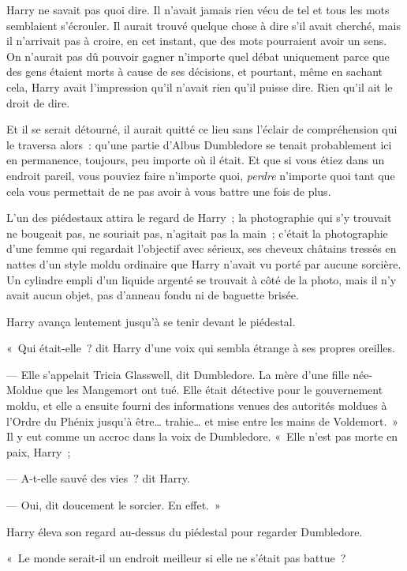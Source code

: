 Harry ne savait pas quoi dire. Il n'avait jamais rien vécu de tel et tous les mots semblaient s'écrouler. Il aurait trouvé quelque chose à dire s'il avait cherché, mais il n'arrivait pas à croire, en cet instant, que des mots pourraient avoir un sens. On n'aurait pas dû pouvoir gagner n'importe quel débat uniquement parce que des gens étaient morts à cause de ses décisions, et pourtant, même en sachant cela, Harry avait l'impression qu'il n'avait rien qu'il puisse dire. Rien qu'il ait le droit de dire.

Et il se serait détourné, il aurait quitté ce lieu sans l'éclair de compréhension qui le traversa alors~: qu'une partie d'Albus Dumbledore se tenait probablement ici en permanence, toujours, peu importe où il était. Et que si vous étiez dans un endroit pareil, vous pouviez faire n'importe quoi, \emph{perdre} n'importe quoi tant que cela vous permettait de ne pas avoir à vous battre une fois de plus.

L'un des piédestaux attira le regard de Harry~; la photographie qui s'y trouvait ne bougeait pas, ne souriait pas, n'agitait pas la main~; c'était la photographie d'une femme qui regardait l'objectif avec sérieux, ses cheveux châtains tressés en nattes d'un style moldu ordinaire que Harry n'avait vu porté par aucune sorcière. Un cylindre empli d'un liquide argenté se trouvait à côté de la photo, mais il n'y avait aucun objet, pas d'anneau fondu ni de baguette brisée.

Harry avança lentement jusqu'à se tenir devant le piédestal.

«~Qui était-elle~? dit Harry d'une voix qui sembla étrange à ses propres oreilles.

--- Elle s'appelait Tricia Glasswell, dit Dumbledore. La mère d'une fille née-Moldue que les Mangemort ont tué. Elle était détective pour le gouvernement moldu, et elle a ensuite fourni des informations venues des autorités moldues à l'Ordre du Phénix jusqu'à être… trahie… et mise entre les mains de Voldemort.~» Il y eut comme un accroc dans la voix de Dumbledore. «~Elle n'est pas morte en paix, Harry~;

--- A-t-elle sauvé des vies~? dit Harry.

--- Oui, dit doucement le sorcier. En effet.~»

Harry éleva son regard au-dessus du piédestal pour regarder Dumbledore.

«~Le monde serait-il un endroit meilleur si elle ne s'était pas battue~?

